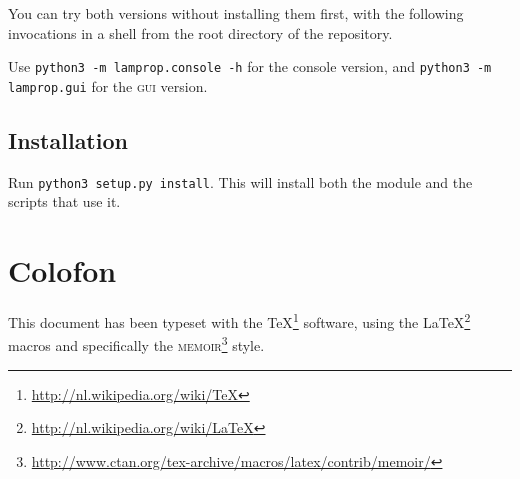 \documentclass[a4paper,landscape,oneside,11pt,twocolumn]{memoir}
\begin{document}
You can try both versions without installing them first, with the following
invocations in a shell from the root directory of the repository.

Use \texttt{python3 -m lamprop.console -h} for the console version, and
\texttt{python3 -m lamprop.gui} for the \textsc{gui} version.


\section{Installation}

Run \texttt{python3 setup.py install}. This will install both the module and
the scripts that use it.




%
%
\chapter{Colofon}

This document has been typeset with the
\TeX\footnote{\url{http://nl.wikipedia.org/wiki/TeX}}
software, using the \LaTeX\footnote{\url{http://nl.wikipedia.org/wiki/LaTeX}}
macros and specifically the
\textsc{memoir}\footnote{%
    \url{http://www.ctan.org/tex-archive/macros/latex/contrib/memoir/}} style.
\end{document}
